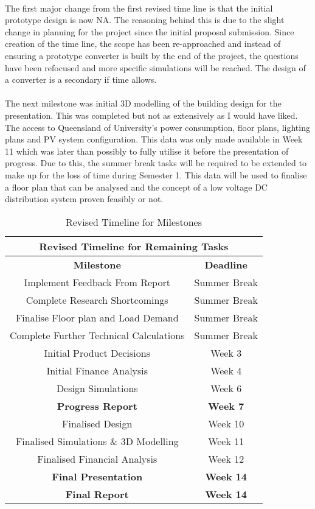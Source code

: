 \paragraph{}
The first major change from the first revised time line is that the initial prototype design is now NA. The reasoning behind this is due to the slight change in planning for the project since the initial proposal submission. Since creation of the time line, the scope has been re-approached and instead of ensuring a prototype converter is built by the end of the project, the questions have been refocused and more specific simulations will be reached. The design of a converter is a secondary if time allows. 

\paragraph{}
The next milestone was initial 3D modelling of the building design for the presentation. This was completed but not as extensively as I would have liked. The access to Queensland of University's power consumption, floor plans, lighting plans and PV system configuration. This data was only made available in Week 11 which was later than possibly to fully utilise it before the presentation of progress. Due to this, the summer break tasks will be required to be extended to make up for the loss of time during Semester 1. This data will be used to finalise a floor plan that can be analysed and the concept of a low voltage DC distribution system proven feasibly or not.  

\begin{table}[H]
\centering
\begin{tabular}{||c c||} 
 \hline
 \multicolumn{2}{|c|}{\textbf{Revised Timeline for Remaining Tasks}} \\ \hline\hline
 \textbf{Milestone} & \textbf{Deadline}\\ [0.5ex] 
 \hline\hline
 Implement Feedback From Report & Summer Break  \\
 Complete Research Shortcomings & Summer Break  \\
 Finalise Floor plan and Load Demand & Summer Break  \\
 Complete Further Technical Calculations & Summer Break  \\
 Initial Product Decisions & Week 3  \\
 Initial Finance Analysis & Week 4  \\
 Design Simulations & Week 6  \\ 
 \textbf{Progress Report} & \textbf{Week 7}  \\
 Finalised Design & Week 10  \\
 Finalised Simulations \& 3D Modelling & Week 11  \\
 Finalised Financial Analysis & Week 12  \\ 
 \textbf{Final Presentation} & \textbf{Week 14} \\
 \textbf{Final Report} & \textbf{Week 14} \\ [1ex] 
 \hline
\end{tabular}
\caption{Revised Timeline for Milestones}
\label{table:milestones_3}
\end{table} 
